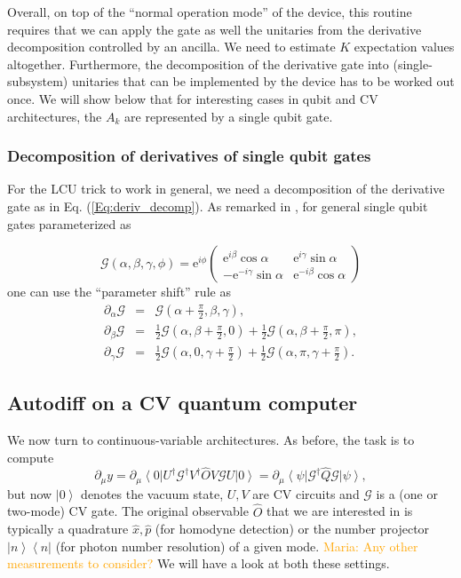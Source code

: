 \documentclass[aps,pra,10pt,twocolumn,groupedaddress,nofootinbib]{revtex4-1}
\theoremstyle{plain}
\newcommand{\ket}[1]{\ensuremath{\left| #1 \right \rangle}}
\newcommand{\bra}[1]{\ensuremath{\left \langle #1 \right |}}
\newcommand{\ketbra}[2]{\ket{#1}\bra{#2}}
\newcommand{\x}{\hat{x}}
\newcommand{\p}{\hat{p}}
\newcommand{\e}{\mathrm{e}}
\newcommand{\G}{\mathcal{G}}
\newcommand{\maria}[1]{\textcolor{orange}{Maria: #1}}
\begin{document}
Overall, on top of the ``normal operation mode'' of the device, this routine requires that we can apply the gate as well the unitaries from the derivative decomposition controlled by an ancilla. We need to estimate $K$ expectation values altogether. Furthermore, the decomposition of the derivative gate into (single-subsystem)  unitaries that can be implemented by the device has to be worked out once. We will show below that for interesting cases in qubit and CV architectures, the $A_k$ are represented by a single qubit gate.

\subsubsection{Decomposition of derivatives of single qubit gates}
For the LCU trick to work in general, we need a decomposition of the derivative gate as in Eq. (\ref{Eq:deriv_decomp}). As remarked in \cite{schuld18cc}, for general single qubit gates parameterized as

\begin{equation*} \label{eq:1q:parametrization}
\G (\alpha,\beta, \gamma, \phi ) = \e^{i\phi} \begin{pmatrix} \e^{i\beta} \cos \alpha &  \e^{i\gamma} \sin \alpha\\ -\e^{-i\gamma} \sin \alpha &  \e^{-i\beta} \cos \alpha \end{pmatrix}
\end{equation*}
one can use the ``parameter shift'' rule as
\begin{eqnarray*}
 \partial_{\alpha} \G  &=&  \G(\alpha + \frac{\pi}{2}, \beta, \gamma ),   \\
 \partial_{\beta} \G &=& \frac{1}{2} \G(\alpha, \beta + \frac{\pi}{2} , 0  ) + \frac{1}{2}  \G(\alpha, \beta + \frac{\pi}{2} , \pi ),  \\
\partial_{\gamma} \G &=& \frac{1}{2} \G(\alpha, 0, \gamma + \frac{\pi}{2}  ) + \frac{1}{2}  \G(\alpha, \pi, \gamma + \frac{\pi}{2} ).
\end{eqnarray*}

\subsection{Autodiff on a CV quantum computer}

We now turn to continuous-variable architectures. As before, the task is to compute 
\[\partial_{\mu}y = \partial_{\mu} \bra{0}U^{\dagger} \G^{\dagger} V^{\dagger} \hat{O}V \G U \ket{0} = \partial_{\mu} \bra{\psi} \G^{\dagger} \hat{Q} \G \ket{\psi},  \]
but now  $\ket{0}$ denotes the vacuum state, $U, V$ are CV circuits and $\G$ is a (one or two-mode) CV gate. The original observable $\hat{O}$ that we are interested in is typically a quadrature $\x, \p$ (for homodyne detection) or the number projector $\ketbra{n}{n}$ (for photon number resolution) of a given mode. \maria{Any other measurements to consider?} We will have a look at both these settings.
\end{document}
